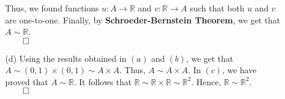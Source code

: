 \documentclass[11pt]{article}
\newcommand{\reals}{\mathbb{R}}
\begin{document}
\begin{itemize}
\begin{itemize}
                    Thus, we found functions $u : A \to \reals$ and $v : \reals
                    \to A$ such that both $u$ and $v$ are one-to-one. Finally,
                    by \textbf{Schroeder-Bernstein Theorem}, we get that $A
                    \sim \reals$.\\
                    $\qed$

                \item[(d)]
                    Using the results obtained in $(a)$ and $(b)$, we get that
                    $A \sim (0, 1) \times (0, 1) \sim A \times A$. Thus, $A
                    \sim A \times A$. In $(c)$, we have proved that $A \sim
                    \reals$.  It follows that $\reals \sim \reals \times \reals
                    \sim \reals^2$. Hence, $\reals \sim \reals^2$.\\
                    $\qed$
            \end{itemize}

\end{itemize}

\end{document}
